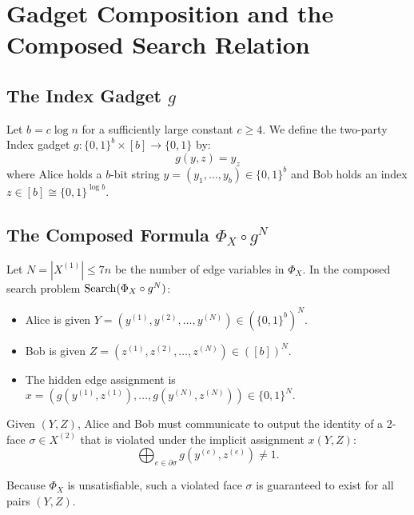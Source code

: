 \chapter{Gadget Composition and the Composed Search Relation}

\section{The Index Gadget $g$}
Let $b = c \log n$ for a sufficiently large constant $c \ge 4$.
We define the two-party Index gadget $g: \{0,1\}^b \times [b] \to \{0,1\}$ by:
\[
g(y, z) = y_z
\]
where Alice holds a $b$-bit string $y = (y_1, \dots, y_b) \in \{0,1\}^b$ and Bob holds an index $z \in [b] \cong \{0,1\}^{\log b}$.

\section{The Composed Formula $\Phi_X \circ g^N$}
Let $N = |X^{(1)}| \le 7n$ be the number of edge variables in $\Phi_X$.
In the composed search problem $\mathrm{Search}(\Phi_X \circ g^N)$:
\begin{itemize}
    \item Alice is given $Y = (y^{(1)}, y^{(2)}, \dots, y^{(N)}) \in (\{0,1\}^b)^N$.
    \item Bob is given $Z = (z^{(1)}, z^{(2)}, \dots, z^{(N)}) \in ([b])^N$.
    \item The hidden edge assignment is $x = (g(y^{(1)}, z^{(1)}), \dots, g(y^{(N)}, z^{(N)})) \in \{0, 1\}^N$.
\end{itemize}

\begin{definition}
Given $(Y, Z)$, Alice and Bob must communicate to output the identity of a 2-face $\sigma \in X^{(2)}$ that is violated under the implicit assignment $x(Y, Z)$:
\[
\bigoplus_{e \in \partial \sigma} g(y^{(e)}, z^{(e)}) \neq 1.
\]
\end{definition}
Because $\Phi_X$ is unsatisfiable, such a violated face $\sigma$ is guaranteed to exist for all pairs $(Y, Z)$.
